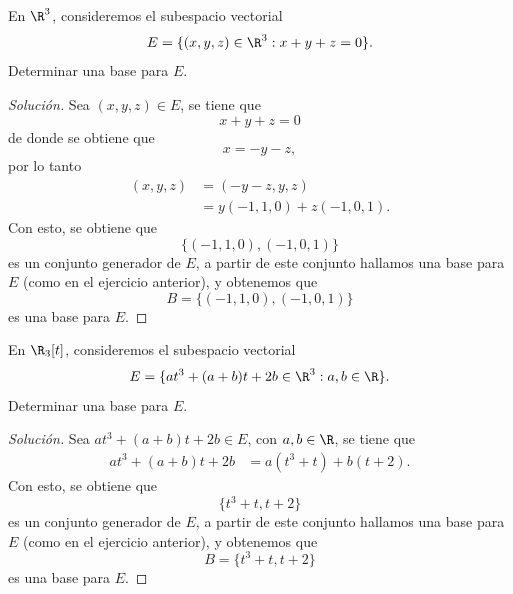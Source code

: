 \documentclass[a4,11pt]{aleph-notas}
\begin{document}
\begin{ejer}
    En $\R^3$, consideremos el subespacio vectorial
    \[
        E = \{(x,y,z)\in \R^3 : x+y+z=0 \}.
    \]
    Determinar una base para $E$.
\end{ejer}

\begin{proof}[Solución]
    Sea $(x,y,z)\in E$, se tiene que
    \[
        x+y+z=0
    \]
    de donde se obtiene que 
    \[
        x = -y - z,
    \]
    por lo tanto
    \begin{align*}
        (x,y,z)
            & = (-y - z,y,z) \\
            & = y(-1,1,0) + z(-1,0,1).
    \end{align*}
    Con esto, se obtiene que
    \[
        \{(-1,1,0) , (-1,0,1)\}
    \]
    es un conjunto generador de $E$, a partir de este conjunto hallamos una base para $E$ (como en el ejercicio anterior), y obtenemos que 
    \[
        B = \{(-1,1,0) , (-1,0,1)\}
    \]
    es una base para $E$.
\end{proof}


\begin{ejer}
    En $\R_3[t]$, consideremos el subespacio vectorial
    \[
        E = \{at^3 + (a+b)t + 2b\in \R^3 : a,b\in\R \}.
    \]
    Determinar una base para $E$.
\end{ejer}

\begin{proof}[Solución]
    Sea $at^3 + (a+b)t + 2b\in E$, con $a,b\in\R$, se tiene que
    \begin{align*}
        at^3 + (a+b)t + 2b
            & = a(t^3+t) + b(t+2).
    \end{align*}
    Con esto, se obtiene que
    \[
        \{t^3+t , t+2\}
    \]
    es un conjunto generador de $E$, a partir de este conjunto hallamos una base para $E$ (como en el ejercicio anterior), y obtenemos que 
    \[
        B = \{t^3+t , t+2\}
    \]
    es una base para $E$.
\end{proof}
\end{document}
